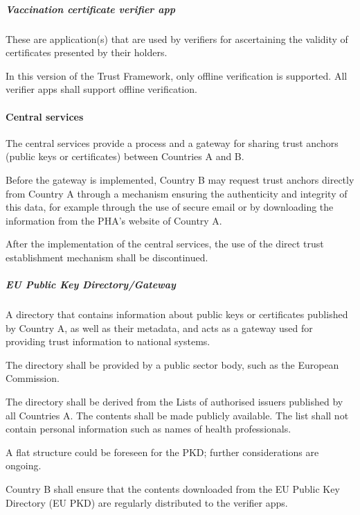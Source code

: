 \documentclass[a4paper,12pt,english]{sphinxhowto}
\begin{document}
\subparagraph{Vaccination certificate verifier app}
\label{\detokenize{ssi/annotehealth:vaccination-certificate-verifier-app}}
\sphinxAtStartPar
These are application(s) that are used by verifiers for ascertaining the validity of certificates presented by their holders.

\sphinxAtStartPar
In this version of the Trust Framework, only offline verification is supported. All verifier apps shall support offline verification.


\paragraph{Central services}
\label{\detokenize{ssi/annotehealth:central-services}}
\sphinxAtStartPar
The central services provide a process and a gateway for sharing trust anchors (public keys or certificates) between Countries A and B.

\sphinxAtStartPar
Before the gateway is implemented, Country B may request trust anchors directly from Country A through a mechanism ensuring the authenticity and integrity of this data, for example through the use of secure email or by downloading the information from the PHA’s website of Country A.

\sphinxAtStartPar
After the implementation of the central services, the use of the direct trust establishment mechanism shall be discontinued.


\subparagraph{EU Public Key Directory/Gateway}
\label{\detokenize{ssi/annotehealth:eu-public-key-directory-gateway}}
\sphinxAtStartPar
A directory that contains information about public keys or certificates published by Country A, as well as their metadata, and acts as a gateway used for providing trust information to national systems.

\sphinxAtStartPar
The directory shall be provided by a public sector body, such as the European Commission.

\sphinxAtStartPar
The directory shall be derived from the Lists of authorised issuers published by all Countries A. The contents shall be made publicly available. The list shall not contain personal information such as names of health professionals.

\sphinxAtStartPar
A flat structure could be foreseen for the PKD; further considerations are ongoing.

\sphinxAtStartPar
Country B shall ensure that the contents downloaded from the EU Public Key Directory (EU PKD) are regularly distributed to the verifier apps.
\end{document}

